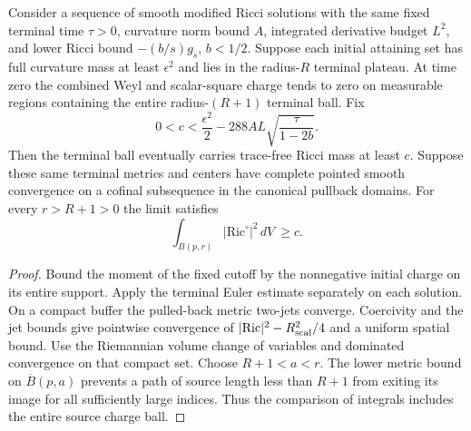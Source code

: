 \begin{theorem}
\label{thm:ed03-pointed-terminal-charge}
\leanok
Consider a sequence of smooth modified Ricci solutions with the same fixed
terminal time $\tau>0$, curvature norm bound $A$, integrated derivative
budget $L^2$, and lower Ricci bound $-(b/s)g_s$, $b<1/2$. Suppose each
initial attaining set has full curvature mass at least $\epsilon^2$ and
lies in the radius-$R$ terminal plateau. At time zero the combined
Weyl and scalar-square charge tends to zero on measurable regions
containing the entire radius-$(R+1)$ terminal ball. Fix
\[
 0<c<\frac{\epsilon^2}{2}-288 A L\sqrt{\frac{\tau}{1-2b}} .
\]
Then the terminal ball eventually carries trace-free Ricci mass at least
$c$. Suppose these same terminal metrics and centers have complete pointed
smooth convergence on a cofinal subsequence in the canonical pullback
domains. For every $r>R+1>0$ the limit satisfies
\[
  \int_{B(p,r)} |\mathrm{Ric}^{\circ}|^2\,dV\ \ge c .
\]
\end{theorem}
\begin{proof}
\leanok
Bound the moment of the fixed cutoff by the nonnegative initial charge on
its entire support. Apply the terminal Euler estimate separately on each
solution. On a compact buffer the pulled-back metric two-jets converge.
Coercivity and the jet bounds give pointwise convergence of
$|\mathrm{Ric}|^2-R_{\rm scal}^2/4$ and a uniform spatial bound.
Use the Riemannian volume change of variables and dominated convergence
on that compact set. Choose $R+1<a<r$. The lower metric bound on
$\overline B(p,a)$ prevents a path of source length less than $R+1$ from
exiting its image for all sufficiently large indices. Thus the comparison
of integrals includes the entire source charge ball.
\end{proof}

